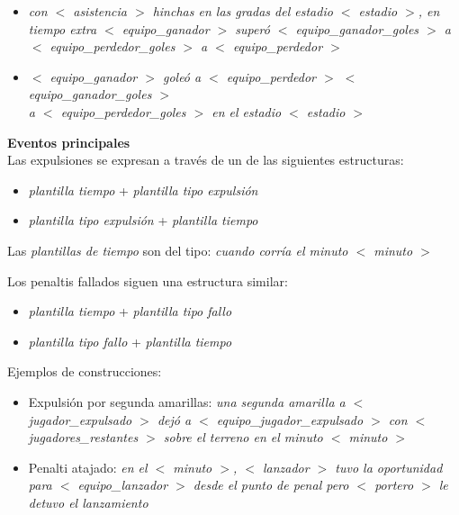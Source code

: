         \begin{itemize}
           \item  \textit{ con  $<$ asistencia $>$ hinchas en las gradas del estadio $<$ estadio $>$, en tiempo extra $<$ equipo\_ganador $>$ superó $<$ equipo\_ganador\_goles $>$ a \\$<$ equipo\_perdedor\_goles $>$ a $<$ equipo\_perdedor $>$ }
        
            \item  \textit{$<$ equipo\_ganador $>$ goleó a $<$ equipo\_perdedor $>$ $<$ equipo\_ganador\_goles $>$ \\a $<$ equipo\_perdedor\_goles $>$ en el estadio $<$ estadio $>$}
        \end{itemize}



\textbf{Eventos principales}\\


    Las expulsiones se expresan a través de un de las siguientes estructuras:
    \begin{itemize}
        \item \textit{plantilla tiempo} + \textit{plantilla tipo expulsión}
        \item \textit{plantilla tipo expulsión} + \textit{plantilla tiempo}
    \end{itemize}

    Las \textit{plantillas de tiempo} son del tipo: \textit{cuando corría el minuto $<$ minuto $>$}

    Los penaltis fallados siguen una estructura similar:
    \begin{itemize}
        \item \textit{plantilla tiempo} + \textit{plantilla tipo fallo}
        \item \textit{plantilla tipo fallo} + \textit{plantilla tiempo}
    \end{itemize}

    Ejemplos de construcciones: 

    \begin{itemize}
    \item Expulsión por segunda amarillas:  \textit{una segunda amarilla a $<$ jugador\_expulsado $>$ dejó 
    a $<$ equipo\_jugador\_expulsado $>$ con $<$ jugadores\_restantes $>$ sobre el terreno 
    en el minuto $<$ minuto $>$}
    
    \item Penalti atajado: \textit{en el $<$ minuto $>$, $<$ lanzador $>$ tuvo la oportunidad 
    para $<$ equipo\_lanzador $>$ desde el punto de penal pero $<$ portero $>$ le detuvo el lanzamiento}
    \end{itemize}


